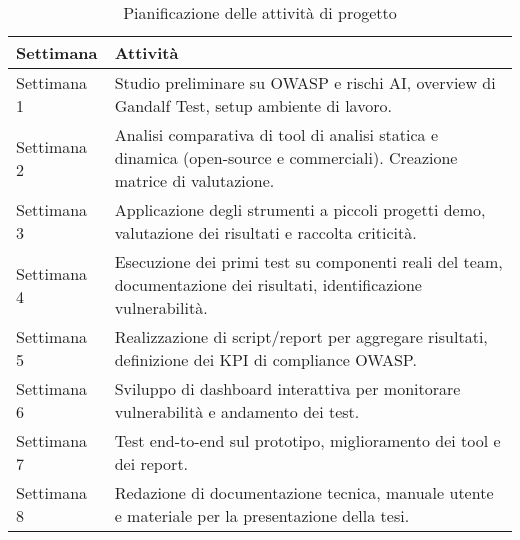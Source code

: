 \begin{table}[htbp]
    \centering
    \renewcommand{\arraystretch}{1.2}
    \begin{tabular}{|p{3cm}|p{10cm}|}
        \hline
        \textbf{Settimana} & \textbf{Attività} \\
        \hline
        Settimana 1 & Studio preliminare su OWASP e rischi AI, overview di Gandalf Test, setup ambiente di
lavoro.\\
        \hline
        Settimana 2 & Analisi comparativa di tool di analisi statica e dinamica (open-source e commerciali).
Creazione matrice di valutazione.\\
        \hline
        Settimana 3 & Applicazione degli strumenti a piccoli progetti demo, valutazione dei risultati e raccolta
criticità.\\
        \hline
        Settimana 4 & Esecuzione dei primi test su componenti reali del team, documentazione dei risultati,
identificazione vulnerabilità.\\
        \hline
        Settimana 5 & Realizzazione di script/report per aggregare risultati, definizione dei KPI di compliance
OWASP.\\
        \hline
        Settimana 6 & Sviluppo di dashboard interattiva per monitorare vulnerabilità e andamento dei test.\\
        \hline
        Settimana 7 & Test end-to-end sul prototipo, miglioramento dei tool e dei report.\newline\mbox{}\\
        \hline
        Settimana 8 & Redazione di documentazione tecnica, manuale utente e materiale per la presentazione
della tesi.\\
        \hline
    \end{tabular}
    \caption{Pianificazione delle attività di progetto}
\end{table}